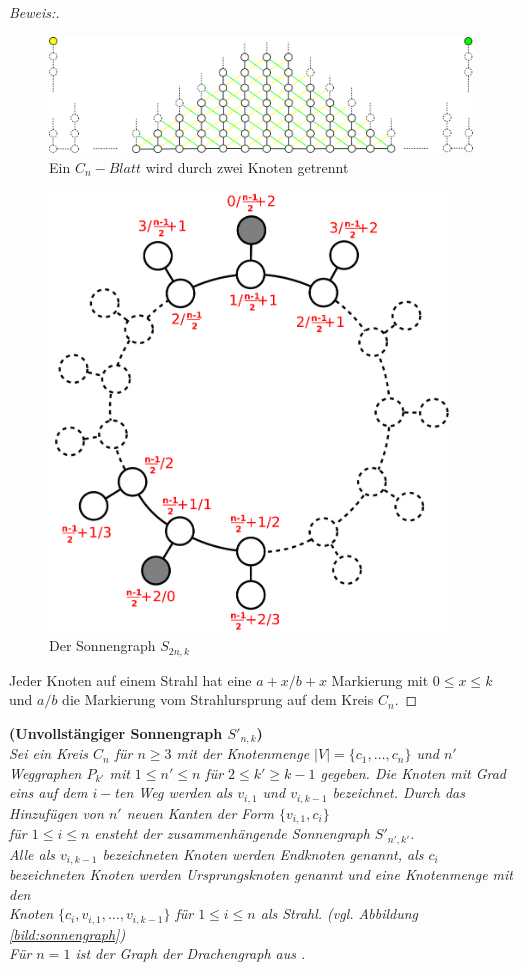 \begin{proof}[Beweis:]
\begin{figure}[h!]
		\centering
 		 \includegraphics[width=430pt]{bilder/sonne1.pdf}
   \caption{Ein $C_{n}-Blatt$ wird durch zwei Knoten getrennt}
  	 \end{figure}
  	 
  	 \begin{figure}[h!]
		\centering
 		 \includegraphics[width=300pt]{bilder/sonne2.pdf}
   \caption{Der Sonnengraph $S_{2n,k}$}
  	 \end{figure}
Jeder Knoten auf einem Strahl hat eine $a+x/b+x$ Markierung mit $0 \leq x \leq k$ und $a/b$ die Markierung vom Strahlursprung auf dem Kreis $C_n$.
\end{proof}  	 
\begin{defi}{\textbf{(Unvollstängiger Sonnengraph $S'_{n,k}$)}}\\
\emph{Sei ein Kreis $C_n$ für $n \geq 3$ mit der Knotenmenge $|V|=\{ c_1, \ldots , c_n \}$ und $n'$ Weggraphen $P_{k'}$ mit $1 \leq n' \leq n$ für $2 \leq k' \geq k-1$ gegeben. Die Knoten mit Grad eins auf dem $i-$ten Weg werden als $v_{i,1}$ 
und $v_{i,k-1}$ bezeichnet. Durch das Hinzufügen von $n'$ neuen Kanten der Form $\{v_{i,1},c_i\}$\\für $1 \leq i \leq n$ ensteht der zusammenhängende Sonnengraph $S'_{n',k'}$.\\
Alle als $v_{i,k-1}$ bezeichneten Knoten werden Endknoten genannt, als $c_i$ bezeichneten Knoten werden Ursprungsknoten genannt und eine Knotenmenge mit den\\Knoten $\{c_i,v_{i,1}, \ldots ,v_{i,k-1}\}$ für $1 \leq i \leq n$ als Strahl. (vgl. Abbildung \ref{bild:sonnengraph})\\
Für $n=1$ ist der Graph der Drachengraph aus \cite{blabla}.}
\end{defi}
